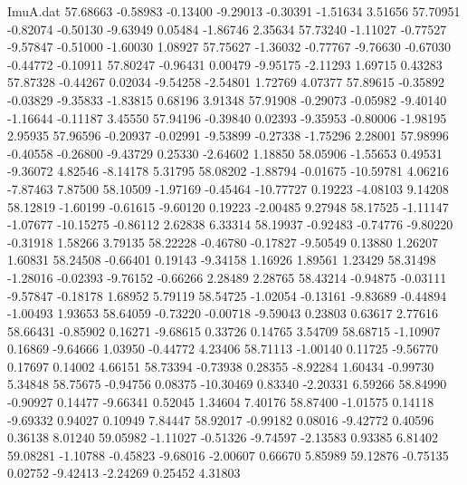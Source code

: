 \begin{filecontents}{ImuA.dat}
  57.68663   -0.58983   -0.13400   -9.29013   -0.30391   -1.51634    3.51656
  57.70951   -0.82074   -0.50130   -9.63949    0.05484   -1.86746    2.35634
  57.73240   -1.11027   -0.77527   -9.57847   -0.51000   -1.60030    1.08927
  57.75627   -1.36032   -0.77767   -9.76630   -0.67030   -0.44772   -0.10911
  57.80247   -0.96431    0.00479   -9.95175   -2.11293    1.69715    0.43283
  57.87328   -0.44267    0.02034   -9.54258   -2.54801    1.72769    4.07377
  57.89615   -0.35892   -0.03829   -9.35833   -1.83815    0.68196    3.91348
  57.91908   -0.29073   -0.05982   -9.40140   -1.16644   -0.11187    3.45550
  57.94196   -0.39840    0.02393   -9.35953   -0.80006   -1.98195    2.95935
  57.96596   -0.20937   -0.02991   -9.53899   -0.27338   -1.75296    2.28001
  57.98996   -0.40558   -0.26800   -9.43729    0.25330   -2.64602    1.18850
  58.05906   -1.55653    0.49531   -9.36072    4.82546   -8.14178    5.31795
  58.08202   -1.88794   -0.01675  -10.59781    4.06216   -7.87463    7.87500
  58.10509   -1.97169   -0.45464  -10.77727    0.19223   -4.08103    9.14208
  58.12819   -1.60199   -0.61615   -9.60120    0.19223   -2.00485    9.27948
  58.17525   -1.11147   -1.07677  -10.15275   -0.86112    2.62838    6.33314
  58.19937   -0.92483   -0.74776   -9.80220   -0.31918    1.58266    3.79135
  58.22228   -0.46780   -0.17827   -9.50549    0.13880    1.26207    1.60831
  58.24508   -0.66401    0.19143   -9.34158    1.16926    1.89561    1.23429
  58.31498   -1.28016   -0.02393   -9.76152   -0.66266    2.28489    2.28765
  58.43214   -0.94875   -0.03111   -9.57847   -0.18178    1.68952    5.79119
  58.54725   -1.02054   -0.13161   -9.83689   -0.44894   -1.00493    1.93653
  58.64059   -0.73220   -0.00718   -9.59043    0.23803    0.63617    2.77616
  58.66431   -0.85902    0.16271   -9.68615    0.33726    0.14765    3.54709
  58.68715   -1.10907    0.16869   -9.64666    1.03950   -0.44772    4.23406
  58.71113   -1.00140    0.11725   -9.56770    0.17697    0.14002    4.66151
  58.73394   -0.73938    0.28355   -8.92284    1.60434   -0.99730    5.34848
  58.75675   -0.94756    0.08375  -10.30469    0.83340   -2.20331    6.59266
  58.84990   -0.90927    0.14477   -9.66341    0.52045    1.34604    7.40176
  58.87400   -1.01575    0.14118   -9.69332    0.94027    0.10949    7.84447
  58.92017   -0.99182    0.08016   -9.42772    0.40596    0.36138    8.01240
  59.05982   -1.11027   -0.51326   -9.74597   -2.13583    0.93385    6.81402
  59.08281   -1.10788   -0.45823   -9.68016   -2.00607    0.66670    5.85989
  59.12876   -0.75135    0.02752   -9.42413   -2.24269    0.25452    4.31803

\end{filecontents}
